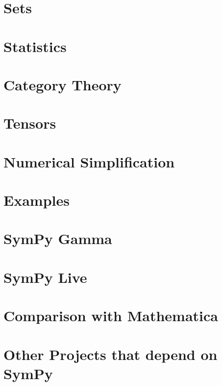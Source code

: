 \documentclass[fleqn,10pt,lineno,numbers]{wlpeerj} %
\begin{document}
\section{Sets}
\label{suppsec:Sets}


\section{Statistics}
\label{suppsec:Stats}


\section{Category Theory}
\label{suppsec:Cat}


\section{Tensors}
\label{suppsec:Ten}


\section{Numerical Simplification}
\label{suppsec:numsimpl}


\section{Examples}
\label{suppsec:examples}


\section{SymPy Gamma}\label{sympy-gamma}



\section{SymPy Live}\label{sympy-live}



\section{Comparison with Mathematica}
\label{comp-mma}


\section{Other Projects that depend on SymPy}
\label{other-proj}



\end{document}

